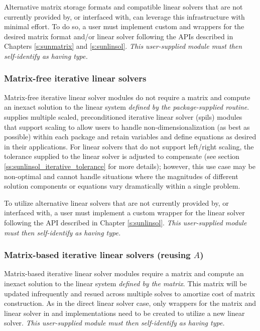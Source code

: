 Alternative matrix storage formats and compatible linear solvers that are not
currently provided by, or interfaced with, {\sundials} can leverage this
infrastructure with minimal effort. To do so, a user must implement custom
{\sunmatrix} and {\sunlinsol} wrappers for the desired matrix format
and/or linear solver following the APIs described in Chapters
\ref{s:sunmatrix} and \ref{s:sunlinsol}. \emph{This user-supplied
{\sunlinsol} module must then self-identify as having
 type.}

\subsubsection*{Matrix-free iterative linear solvers}

Matrix-free iterative linear solver modules do not require a matrix and compute
an inexact solution to the linear system \textit{defined by the package-supplied
 routine}. {\sundials} supplies multiple scaled, preconditioned
iterative linear solver (spils) {\sunlinsol} modules that support scaling to
allow users to handle non-dimensionalization (as best as possible) within each
{\sundials} package and retain variables and define equations as desired in
their applications. For linear solvers that do not support left/right scaling,
the tolerance supplied to the linear solver is adjusted to compensate (see
section \ref{ss:sunlinsol_iterative_tolerance} for more details); however, this
use case may be non-optimal and cannot handle situations where the magnitudes of
different solution components or equations vary dramatically within a single
problem.

To utilize alternative linear solvers that are not currently provided by, or
interfaced with, {\sundials} a user must implement a custom {\sunlinsol} wrapper
for the linear solver following the API described in Chapter \ref{s:sunlinsol}.
\emph{This user-supplied {\sunlinsol} module must then self-identify as having
 type.}

\subsubsection*{Matrix-based iterative linear solvers (reusing $A$)}

Matrix-based iterative linear solver modules require a matrix and compute an
inexact solution to the linear system \textit{defined by the matrix}.
This matrix will be updated infrequently and resued across multiple
solves to amortize cost of matrix construction. As in the direct
linear solver case, only wrappers for the matrix and linear solver in
{\sunmatrix} and {\sunlinsol} implementations need to be created to
utilize a new linear solver. \emph{This user-supplied {\sunlinsol}
module must then self-identify as having
 type.}

